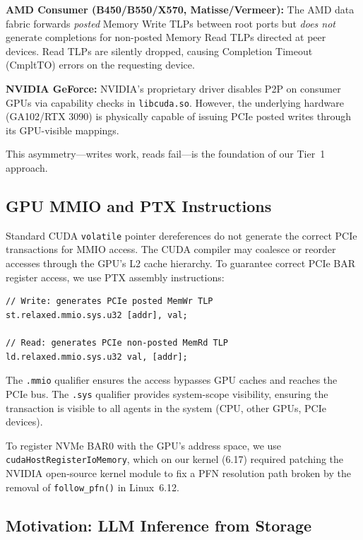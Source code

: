\documentclass{article}
\begin{document}
\textbf{AMD Consumer (B450/B550/X570, Matisse/Vermeer):} The AMD data fabric
forwards \emph{posted} Memory Write TLPs between root ports but \emph{does
not} generate completions for non-posted Memory Read TLPs directed at peer
devices. Read TLPs are silently dropped, causing Completion Timeout (CmpltTO)
errors on the requesting device.

\textbf{NVIDIA GeForce:} NVIDIA's proprietary driver disables P2P on consumer
GPUs via capability checks in \texttt{libcuda.so}. However, the underlying
hardware (GA102/RTX 3090) is physically capable of issuing PCIe posted writes
through its GPU-visible mappings.

This asymmetry---writes work, reads fail---is the foundation of our Tier~1
approach.

\subsection{GPU MMIO and PTX Instructions}

Standard CUDA \texttt{volatile} pointer dereferences do not generate the
correct PCIe transactions for MMIO access. The CUDA compiler may coalesce
or reorder accesses through the GPU's L2 cache hierarchy. To guarantee
correct PCIe BAR register access, we use PTX assembly instructions:

\begin{lstlisting}[language={[x86masm]Assembler},caption={PTX MMIO instructions for PCIe BAR access},label={lst:ptx-mmio}]
// Write: generates PCIe posted MemWr TLP
st.relaxed.mmio.sys.u32 [addr], val;

// Read: generates PCIe non-posted MemRd TLP
ld.relaxed.mmio.sys.u32 val, [addr];
\end{lstlisting}

The \texttt{.mmio} qualifier ensures the access bypasses GPU caches and reaches
the PCIe bus. The \texttt{.sys} qualifier provides system-scope visibility,
ensuring the transaction is visible to all agents in the system (CPU, other
GPUs, PCIe devices).

To register NVMe BAR0 with the GPU's address space, we use
\texttt{cudaHostRegisterIoMemory}, which on our kernel (6.17) required patching
the NVIDIA open-source kernel module to fix a PFN resolution path broken by
the removal of \texttt{follow\_pfn()} in Linux~6.12.

\subsection{Motivation: LLM Inference from Storage}
\end{document}

